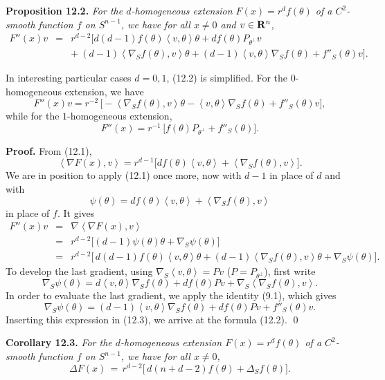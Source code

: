 \documentclass[reqno,12pt]{amsart}
\theoremstyle{plain}
\begin{document}
\vskip5mm
{\bf Proposition 12.2.} {\it For the $d$-homogeneous extension 
$F(x) = r^d f(\theta)$ of a $C^2$-smooth function $f$ on $S^{n-1}$, 
we have for all $x \neq 0$ and $v \in {{\bf R}}^n$,
\begin{eqnarray}
F''(x)v
 & = &
r^{d-2} \Big[d(d-1) f(\theta) \left<v,\theta\right> \theta + 
d f(\theta) P_{\theta^\perp}v \nonumber \\
 & & + \ 
(d-1) \left<\nabla_S f(\theta),v\right> \theta +
(d-1) \left<v,\theta\right> \nabla_S f(\theta) + f''_S(\theta) v\Big].
\end{eqnarray}
}

\vskip2mm
In interesting particular cases $d=0,1$, (12.2) is
simplified. For the $0$-homogeneous extension, we have
$$
F''(x)v = r^{-2}\, \big[-\left<\nabla_S f(\theta),v\right> \theta -
\left<v,\theta\right> \nabla_S f(\theta) + f''_S(\theta) v\big],
$$
while for the $1$-homogeneous extension,
$$
F''(x) = r^{-1}\, \big[f(\theta) P_{\theta^\perp} + f''_S(\theta)\big].
$$

{\bf Proof.} From (12.1),
$$
\left<\nabla F(x),v\right> = r^{d-1} 
\big[d f(\theta) \left<v,\theta\right>  + \left<\nabla_S f(\theta),v\right>\big].
$$
We are in position to apply (12.1) once more, now with $d-1$ in place of $d$
and with 
$$
\psi(\theta) = 
d f(\theta) \left<v,\theta\right>  + \left<\nabla_S f(\theta),v\right>
$$ 
in place of $f$. It gives
\begin{eqnarray}
F''(x)v
 & = &
\nabla \left<\nabla F(x),v\right> \nonumber \\
 & = &
r^{d-2} \big[(d-1) \psi(\theta) \theta  + \nabla_S \psi(\theta)\big]
 \nonumber \\
 & = &
r^{d-2} \big[\,d(d-1) f(\theta) \left<v,\theta\right> \theta  + 
(d-1) \left<\nabla_S f(\theta),v\right> \theta +
\nabla_S \psi(\theta)\big].
\end{eqnarray}
To develop the last gradient, using
$\nabla_S \left<v,\theta\right> = Pv$ ($P = P_{\theta^\perp}$), 
first write
$$
\nabla_S \psi(\theta) = d \left<v,\theta\right> \nabla_S f(\theta) +
d f(\theta) Pv + \nabla_S \left<\nabla_S f(\theta),v\right>.
$$
In order to evaluate the last gradient, we apply the identity (9.1), 
which gives
$$
\nabla_S \psi(\theta) = (d-1) \left<v,\theta\right> \nabla_S f(\theta) +
d f(\theta) Pv + f''_S(\theta) v.
$$
Inserting this expression in (12.3), we arrive at the formula (12.2).
\qed

\vskip5mm
{\bf Corollary 12.3.} {\it For the $d$-homogeneous extension 
$F(x) = r^d f(\theta)$ of a $C^2$-smooth function $f$ on $S^{n-1}$, 
we have for all $x \neq 0$,
\begin{equation}
\Delta F(x) \, = \,
r^{d-2} \big[\,d(n+d-2) f(\theta) + \Delta_S f(\theta)\big].
\end{equation}
}
\end{document}
